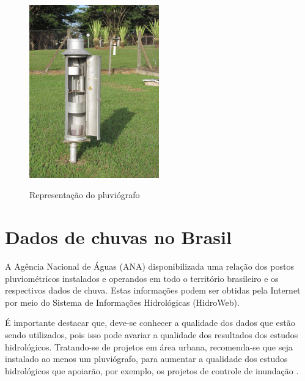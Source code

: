 \begin{figure}[H]
    \caption{Representação do pluviógrafo}
    \centering
    \includegraphics[width=0.5\textwidth]{Textuais/Figuras/pluviografo.jpg}
    \label{fig:pluviografo}
\end{figure}

\section{Dados de chuvas no Brasil}

A Agência Nacional de Águas (ANA) disponibilizada uma relação dos postos pluviométricos instalados e operandos em todo o território brasileiro e os respectivos dados de chuva. Estas informações podem ser obtidas pela Internet por meio do Sistema de Informações Hidrológicas (HidroWeb). 

É importante destacar que, deve-se conhecer a qualidade dos dados que estão sendo utilizados, pois isso pode avariar a qualidade dos resultados dos estudos hidrológicos. Tratando-se de projetos em área urbana, recomenda-se que seja instalado ao menos um pluviógrafo, para aumentar a qualidade dos estudos hidrológicos que apoiarão, por exemplo, os projetos de controle de inundação \cite{tucci1993}.